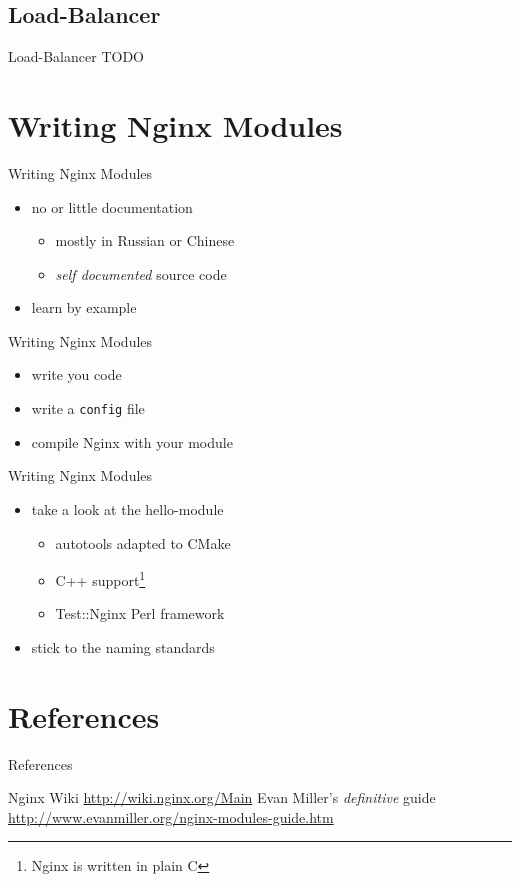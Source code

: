 \documentclass{beamer}
\begin{document}
\subsection{Load-Balancer}

\begin{frame}{Load-Balancer}
TODO 
\end{frame}

\section{Writing Nginx Modules}

\begin{frame}{Writing Nginx Modules}
\begin{itemize}
 \item no or little documentation
 \begin{itemize}
  \item mostly in Russian or Chinese
  \item \emph{self documented} source code
 \end{itemize}
 \item learn by example
\end{itemize}
\end{frame}

\begin{frame}{Writing Nginx Modules}
\begin{itemize}
 \item write you code
 \item write a \verb|config| file
 \item compile Nginx with your module
\end{itemize}

\end{frame}

\begin{frame}{Writing Nginx Modules}
\begin{itemize}
 \item take a look at the hello-module
 \begin{itemize}
  \item autotools adapted to CMake
  \item C++ support\footnote{Nginx is written in plain C}
  \item Test::Nginx Perl framework
 \end{itemize}
\item stick to the naming standards
\end{itemize}
\end{frame}

\section{References}

\begin{frame}{References}
\begin{thebibliography}{10}
  Nginx Wiki 
  \newblock \url{http://wiki.nginx.org/Main}
  Evan Miller's \emph{definitive} guide 
  \newblock \url{http://www.evanmiller.org/nginx-modules-guide.htm}
\end{thebibliography}

\end{frame}
\end{document}
